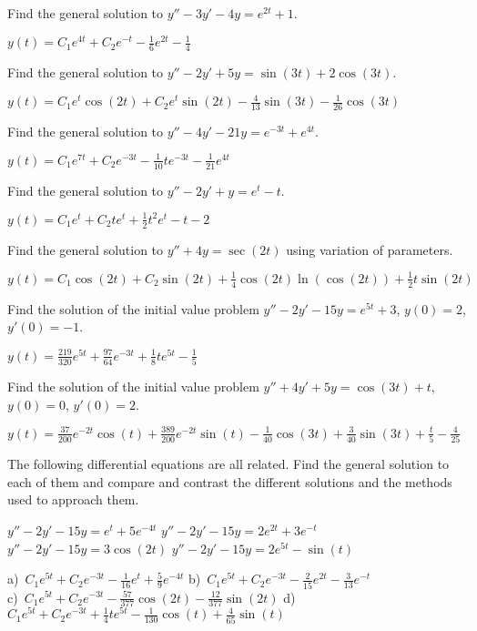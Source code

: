\begin{exercise}
Find the general solution to $y'' - 3y' - 4y = e^{2t} + 1$.
\end{exercise}
\comboSol{%
}
{%
$y(t) = C_1e^{4t} + C_2e^{-t} - \frac{1}{6}e^{2t} - \frac{1}{4}$
}

\begin{exercise}
Find the general solution to $y'' - 2y' + 5y = \sin(3t) + 2\cos(3t)$.
\end{exercise}
\comboSol{%
}
{%
$y(t) = C_1e^t\cos(2t) + C_2e^t\sin(2t) - \frac{4}{13}\sin(3t) - \frac{1}{26}\cos(3t)$
}

\begin{exercise}
Find the general solution to $y'' - 4y' - 21y = e^{-3t} + e^{4t}$.
\end{exercise}
\comboSol{%
}
{%
$y(t) = C_1e^{7t} + C_2e^{-3t} - \frac{1}{10}te^{-3t} - \frac{1}{21}e^{4t}$
}

\begin{exercise}
Find the general solution to $y'' - 2y' + y = e^t - t$.
\end{exercise}
\comboSol{%
}
{%
$y(t) = C_1e^t + C_2te^t + \frac{1}{2}t^2e^t - t - 2$
}

\begin{exercise}
Find the general solution to $y'' + 4y = \sec(2t)$ using variation of parameters.
\end{exercise}
\comboSol{%
}
{%
$y(t) = C_1\cos(2t) + C_2\sin(2t) + \frac{1}{4}\cos(2t)\ln(\cos(2t)) + \frac{1}{2}t\sin(2t)$
}

\begin{exercise}
Find the solution of the initial value problem $y'' - 2y' - 15y = e^{5t} + 3$, $y(0) = 2$, $y'(0) = -1$. 
\end{exercise}
\comboSol{%
}
{%
$y(t) = \frac{219}{320}e^{5t} + \frac{97}{64}e^{-3t} + \frac{1}{8}te^{5t} - \frac{1}{5}$
}

\begin{exercise}
Find the solution of the initial value problem $y'' + 4y' + 5y = \cos(3t) + t$, $y(0) = 0$, $y'(0) = 2$.  
\end{exercise}
\comboSol{%
}
{%
$y(t) = \frac{37}{200}e^{-2t}\cos(t) + \frac{389}{200}e^{-2t}\sin(t) - \frac{1}{40}\cos(3t) + \frac{3}{40}\sin(3t) + \frac{t}{5} - \frac{4}{25}$
}

\begin{exercise}
The following differential equations are all related. Find the general solution to each of them and compare and contrast the different solutions and the methods used to approach them.
\begin{tasks}
\task $y'' - 2y' - 15y = e^t + 5e^{-4t}$
\task $y'' - 2y' - 15y = 2e^{2t} + 3e^{-t}$
\task $y'' - 2y' - 15y = 3\cos(2t)$
\task $y'' - 2y' - 15y = 2e^{5t} - \sin(t)$
\end{tasks}
\end{exercise}
\comboSol{%
}
{%
a)~$C_1e^{5t} + C_2e^{-3t}  - \frac{1}{16}e^t + \frac{5}{9}e^{-4t}$ \quad b)~$C_1e^{5t} + C_2e^{-3t}  - \frac{2}{15}e^{2t} - \frac{3}{13}e^{-t}$ \\
c)~$C_1e^{5t} + C_2e^{-3t}  - \frac{57}{377}\cos(2t) - \frac{12}{377}\sin(2t)$ \quad d)~$C_1e^{5t} + C_2e^{-3t}  + \frac{1}{4}te^{5t} - \frac{1}{130}\cos(t) + \frac{4}{65}\sin(t)$ \\
}

